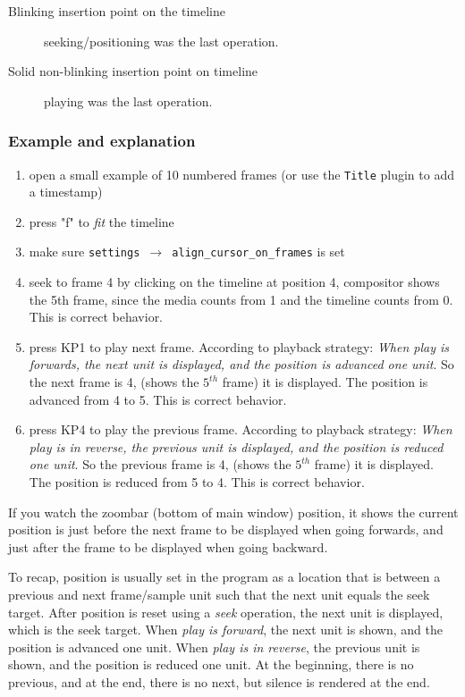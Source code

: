 \begin{description}
    \item[Blinking insertion point on the timeline] seeking/positioning was the last operation.
    \item[Solid non-blinking insertion point on timeline] playing was the last operation.
\end{description}

\subsubsection*{Example and explanation}%
\label{ssub:example_explanation}

\begin{enumerate}
    \item open a small example of 10 numbered frames (or use the \texttt{Title} plugin to add a timestamp)
    \item press "f" to \textit{fit} the timeline
    \item make sure \texttt{settings $\rightarrow$ align\_cursor\_on\_frames} is set
    \item seek to frame 4 by clicking on the timeline at position 4, compositor shows the 5th frame, since the
    media counts from 1 and the timeline counts from 0.  This is correct behavior.
    \item press KP1 to play next frame.  According to playback strategy: \textit{When play is forwards, the next unit is displayed, and the position is advanced one unit}. So the next frame is 4, (shows the $5^{th}$ frame) it is displayed. The position is advanced from 4 to 5.  This is correct behavior.
    \item press KP4 to play the previous frame. According to playback strategy: \textit{When play is in reverse, the previous unit is displayed, and the position is reduced one unit}. So the previous frame is 4, (shows the $5^{th}$ frame) it is displayed. The position is reduced from 5 to 4. This is correct behavior.
\end{enumerate}

If you watch the zoombar (bottom of main window) position, it shows the current position is just before the next frame to be displayed when going forwards, and just after the frame to be displayed when going backward.

To recap, position is usually set in the program as a location that is between a previous and next frame/sample unit such that the next unit equals the seek target.  After position is reset using a \textit{seek} operation, the next unit is displayed, which is the seek target.  When \textit{play is forward}, the next unit is shown, and the position is advanced one unit.  When \textit{play is in reverse}, the previous unit is shown, and the position is reduced one unit.  At the beginning, there is no previous, and at the end, there is no next, but silence is rendered at the end.

